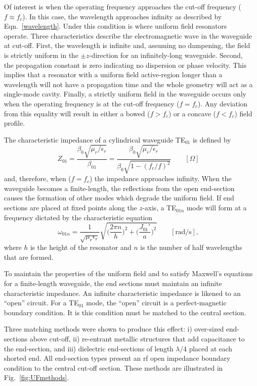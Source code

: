 Of interest is when the operating frequency approaches the cut-off frequency ($f \approx f_c$). In this case, the wavelength approaches infinity as described by Eqn.~\ref{wavelength}. Under this condition is where uniform field resonators operate. Three characteristics describe the electromagnetic wave in the waveguide at cut-off. First, the wavelength is infinite and, assuming no dampening, the field is strictly uniform in the $\pm z$-direction for an infinitely-long waveguide. Second, the propagation constant is zero indicating no dispersion or phase velocity. This implies that a resonator with a uniform field active-region longer than a wavelength will not have a propagation time and the whole geometry will act as a single-mode cavity.  Finally, a strictly uniform field in the waveguide occurs only when the operating frequency is at the cut-off frequency ($f=f_c$). Any deviation from this equality will result in either a bowed ($f>f_c$) or a concave ($f<f_c$) field profile.

The characteristic impedance of a cylindrical waveguide TE$_{01}$ is defined by 
\begin{equation}
    Z_{01} = \frac{\beta_0 \sqrt{\mu_r/ \epsilon_r}}{\beta_{01}} =\frac{\beta_0 \sqrt{\mu_r/ \epsilon_r}}{\beta_0 \sqrt{1-(f_c/f)^2}} \qquad [\Omega]
\end{equation}
and, therefore, when ($f=f_c$) the impedance approaches infinity. When the waveguide becomes a finite-length, the reflections from the open end-section causes the formation of other modes which degrade the uniform field. If end sections are placed at fixed points along the $z$-axis, a TE$_{01n}$ mode will form at a frequency dictated by the characteristic equation
\begin{equation}
    \omega_{01n} = \frac{1}{\sqrt{\mu_r \epsilon_r}}\sqrt{\bigg(\frac{2 \pi n}{h}\bigg)^2+\bigg(\frac{J_{01}'}{a}\bigg)^2} \qquad [\text{rad/s}],
\end{equation}
where $h$ is the height of the resonator and $n$ is the number of half wavelengths that are formed.

To maintain the properties of the uniform field and to satisfy Maxwell's equations for a finite-length waveguide, the end sections must maintain an infinite characteristic impedance. An infinite characteristic impedance is likened to an ``open'' circuit. For a TE$_{01}$ mode, the ``open'' circuit is a perfect-magnetic boundary condition. It is this condition must be matched to the central section. 

Three matching methods were shown to produce this effect: i) over-sized end-sections above cut-off, ii) re-entrant metallic structures that add capacitance to the end-section, and iii) dielectric end-sections of length $\lambda/4$ placed at each shorted end. All end-section types present an rf open impedance boundary condition to the central cut-off section. These methods are illustrated in Fig.~\ref{fig:UFmethods}.

